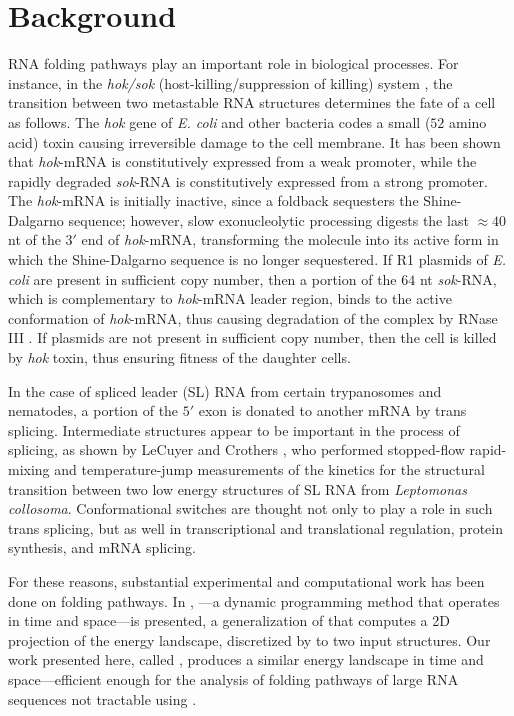 \section{Background}
\label{sec:ffttwo:bkgrnd}

RNA folding pathways play an important role in biological processes.
For instance, in the {\em hok/sok}
(host-killing/suppression of killing) system \citep{gerdes.arg97},
the transition between two metastable RNA structures determines the
fate of a cell as follows.
The {\em hok} gene of {\em E. coli} and other bacteria
codes a small ($52$ amino acid) toxin causing irreversible damage to the cell
membrane. It has been shown that {\em hok}-mRNA is
constitutively expressed from a weak promoter, while
the rapidly degraded {\em sok}-RNA is constitutively expressed from
a strong promoter.  The {\em hok}-mRNA is initially
inactive, since a foldback sequesters the
Shine-Dalgarno sequence; however, slow exonucleolytic processing
digests the last $\approx 40$ nt of the $3'$ end of {\em hok}-mRNA,
transforming the molecule into its active form in which
the Shine-Dalgarno sequence is no longer sequestered.
If R1 plasmids of {\em E. coli} are present in
sufficient copy number, then a portion of the $64$ nt
{\em sok}-RNA, which is complementary to {\em hok}-mRNA leader
region, binds to the active conformation of {\em hok}-mRNA, thus
causing degradation of the complex by RNase III \citep{gerdes.arg97}.
If plasmids are not present in sufficient copy number, then the
cell is killed by {\em hok} toxin, thus ensuring fitness of the daughter
cells.

In the case of spliced leader (SL) RNA from certain trypanosomes and nematodes,
a portion of the $5'$ exon is donated to
another mRNA by trans splicing.
Intermediate structures appear to be important in the process of splicing,
as shown by LeCuyer and Crothers \citep{lecuyercrothers}, who performed
stopped-flow rapid-mixing and temperature-jump measurements
of the kinetics for the structural transition between two low
energy structures of SL RNA from {\em Leptomonas collosoma}.
Conformational switches are thought not only to play a role in such
trans splicing, but as well in transcriptional and
translational regulation, protein synthesis, and mRNA splicing.

For these reasons, substantial experimental and computational work
has been done on folding pathways. In \citep{lorenz}, \rnatwofold---a dynamic
programming method that operates in
 time and  space---is presented, a generalization of \rnabor
\citep{freyhult.b07} that computes a 2D projection of the energy landscape,
discretized by \bpd to two input structures. Our work presented
here, called \ffttwo, produces a similar energy landscape in  time and
 space---efficient enough for the analysis of folding pathways of large
RNA sequences not tractable using \rnatwofold.

